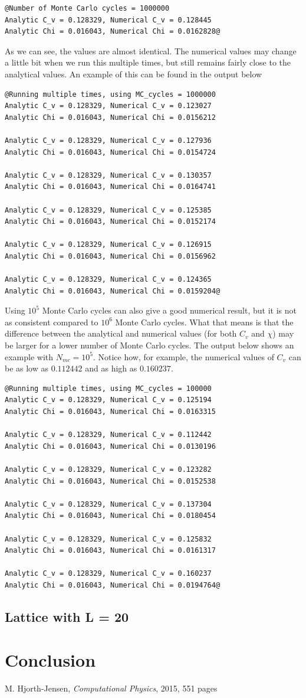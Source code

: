 \documentclass[12pt]{article}
\begin{document}
\begin{lstlisting}
@Number of Monte Carlo cycles = 1000000
Analytic C_v = 0.128329, Numerical C_v = 0.128445
Analytic Chi = 0.016043, Numerical Chi = 0.0162828@
\end{lstlisting}
As we can see, the values are almost identical. The numerical values may change a little bit when we run this multiple times, but still remains fairly close to the analytical values. An example of this can be found in the output below
\begin{lstlisting}
@Running multiple times, using MC_cycles = 1000000
Analytic C_v = 0.128329, Numerical C_v = 0.123027
Analytic Chi = 0.016043, Numerical Chi = 0.0156212
 
Analytic C_v = 0.128329, Numerical C_v = 0.127936
Analytic Chi = 0.016043, Numerical Chi = 0.0154724
 
Analytic C_v = 0.128329, Numerical C_v = 0.130357
Analytic Chi = 0.016043, Numerical Chi = 0.0164741
 
Analytic C_v = 0.128329, Numerical C_v = 0.125385
Analytic Chi = 0.016043, Numerical Chi = 0.0152174
 
Analytic C_v = 0.128329, Numerical C_v = 0.126915
Analytic Chi = 0.016043, Numerical Chi = 0.0156962
 
Analytic C_v = 0.128329, Numerical C_v = 0.124365
Analytic Chi = 0.016043, Numerical Chi = 0.0159204@
\end{lstlisting}
Using $10^5$ Monte Carlo cycles can also give a good numerical result, but it is not as consistent compared to $10^6$ Monte Carlo cycles. What that means is that the difference between the analytical and numerical values (for both $C_v$ and $\chi$) may be larger for a lower number of Monte Carlo cycles. The output below shows an example with $N_{mc} = 10^5$. Notice how, for example, the numerical values of $C_v$ can be as low as $0.112442$ and as high as $0.160237$.
\begin{lstlisting}
@Running multiple times, using MC_cycles = 100000
Analytic C_v = 0.128329, Numerical C_v = 0.125194
Analytic Chi = 0.016043, Numerical Chi = 0.0163315
 
Analytic C_v = 0.128329, Numerical C_v = 0.112442
Analytic Chi = 0.016043, Numerical Chi = 0.0130196
 
Analytic C_v = 0.128329, Numerical C_v = 0.123282
Analytic Chi = 0.016043, Numerical Chi = 0.0152538
 
Analytic C_v = 0.128329, Numerical C_v = 0.137304
Analytic Chi = 0.016043, Numerical Chi = 0.0180454
 
Analytic C_v = 0.128329, Numerical C_v = 0.125832
Analytic Chi = 0.016043, Numerical Chi = 0.0161317
 
Analytic C_v = 0.128329, Numerical C_v = 0.160237
Analytic Chi = 0.016043, Numerical Chi = 0.0194764@
\end{lstlisting}

\subsection*{Lattice with L = 20}
\section{Conclusion} \label{section:conclusion}

\FloatBarrier
\begin{thebibliography}{1}
     M. Hjorth-Jensen, \emph{Computational Physics}, 2015, 551 pages
\end{thebibliography}
\end{document}
